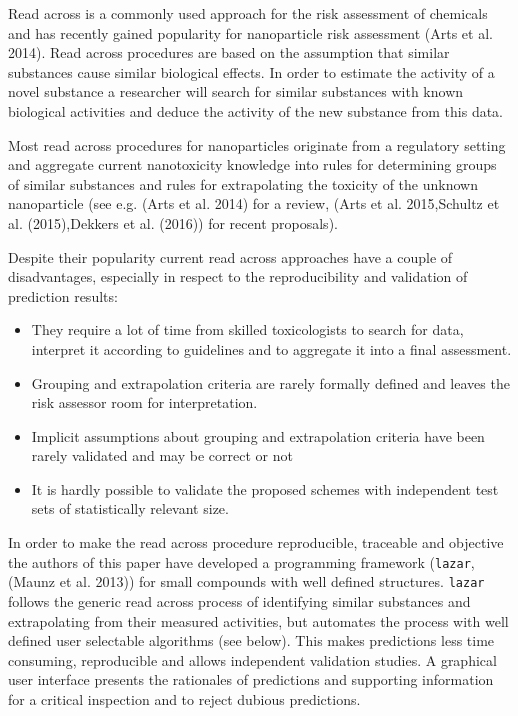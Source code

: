 \documentclass[utf8]{frontiersHLTH} %
\providecommand{\tightlist}{%
  \setlength{\itemsep}{0pt}\setlength{\parskip}{0pt}}
\begin{document}
Read across is a commonly used approach for the risk assessment of
chemicals and has recently gained popularity for nanoparticle risk
assessment (Arts et al. 2014). Read across procedures are based on the
assumption that similar substances cause similar biological effects. In
order to estimate the activity of a novel substance a researcher will
search for similar substances with known biological activities and
deduce the activity of the new substance from this data.

Most read across procedures for nanoparticles originate from a
regulatory setting and aggregate current nanotoxicity knowledge into
rules for determining groups of similar substances and rules for
extrapolating the toxicity of the unknown nanoparticle (see e.g. (Arts
et al. 2014) for a review, (Arts et al. 2015,Schultz et al.
(2015),Dekkers et al. (2016)) for recent proposals).

Despite their popularity current read across approaches have a couple of
disadvantages, especially in respect to the reproducibility and
validation of prediction results:

\begin{itemize}
\tightlist
\item
  They require a lot of time from skilled toxicologists to search for
  data, interpret it according to guidelines and to aggregate it into a
  final assessment.
\item
  Grouping and extrapolation criteria are rarely formally defined and
  leaves the risk assessor room for interpretation.
\item
  Implicit assumptions about grouping and extrapolation criteria have
  been rarely validated and may be correct or not
\item
  It is hardly possible to validate the proposed schemes with
  independent test sets of statistically relevant size.
\end{itemize}

In order to make the read across procedure reproducible, traceable and
objective the authors of this paper have developed a programming
framework (\texttt{lazar}, (Maunz et al. 2013)) for small compounds with
well defined structures. \texttt{lazar} follows the generic read across
process of identifying similar substances and extrapolating from their
measured activities, but automates the process with well defined user
selectable algorithms (see below). This makes predictions less time
consuming, reproducible and allows independent validation studies. A
graphical user interface presents the rationales of predictions and
supporting information for a critical inspection and to reject dubious
predictions.
\end{document}
